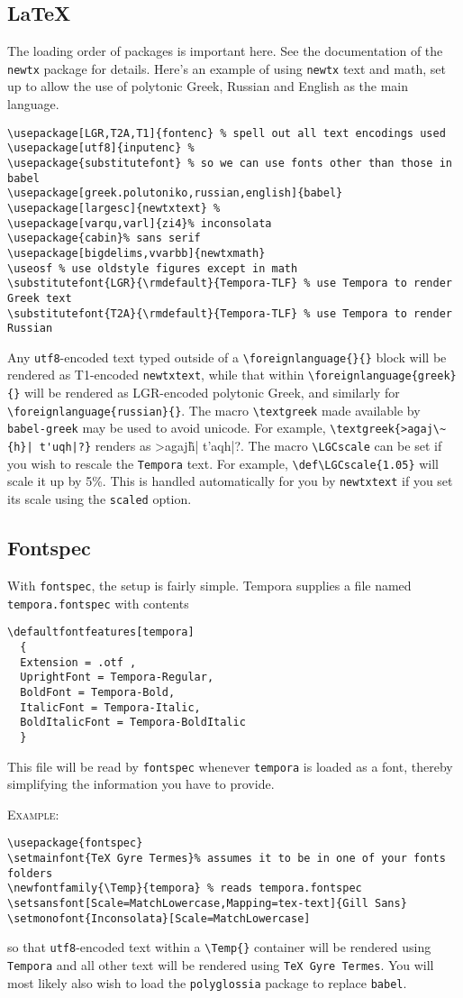 \documentclass[11pt]{article}
\begin{document}
\subsection*{LaTeX} The loading order of packages is important here. See the documentation of the {\tt newtx} package for details. Here's an example of using {\tt newtx} text and math, set up to allow the use of polytonic Greek, Russian and English as the main language.
\begin{verbatim}
\usepackage[LGR,T2A,T1]{fontenc} % spell out all text encodings used
\usepackage[utf8]{inputenc} % 
\usepackage{substitutefont} % so we can use fonts other than those in babel
\usepackage[greek.polutoniko,russian,english]{babel}
\usepackage[largesc]{newtxtext} % 
\usepackage[varqu,varl]{zi4}% inconsolata
\usepackage{cabin}% sans serif
\usepackage[bigdelims,vvarbb]{newtxmath}
\useosf % use oldstyle figures except in math
\substitutefont{LGR}{\rmdefault}{Tempora-TLF} % use Tempora to render Greek text
\substitutefont{T2A}{\rmdefault}{Tempora-TLF} % use Tempora to render Russian 
\end{verbatim}
Any {\tt utf8}-encoded text typed outside of a \verb|\foreignlanguage{}{}| block will be rendered as T1-encoded {\tt newtxtext}, while that within \verb|\foreignlanguage{greek}{}| will be rendered as LGR-encoded polytonic Greek, and similarly for \verb|\foreignlanguage{russian}{}|. The macro \verb|\textgreek| made available by {\tt babel-greek} may be used to avoid unicode. For example, \verb+\textgreek{>agaj\~{h}| t'uqh|?}+ renders as \textgreek{>agaj\~{h}| t'aqh|?}. The macro \verb|\LGCscale| can be set if you wish to rescale the {\tt Tempora} text. For example, \verb|\def\LGCscale{1.05}| will scale it up by 5\%. This is handled automatically for you by {\tt newtxtext} if you set its scale using the {\tt scaled} option.

\subsection*{Fontspec} With {\tt fontspec}, the setup is fairly simple. Tempora supplies a file named {\tt tempora.fontspec} with contents
\begin{verbatim}
\defaultfontfeatures[tempora]
  {
  Extension = .otf ,
  UprightFont = Tempora-Regular,
  BoldFont = Tempora-Bold,
  ItalicFont = Tempora-Italic,
  BoldItalicFont = Tempora-BoldItalic
  }
\end{verbatim}
This file will be read by {\tt fontspec} whenever {\tt tempora} is loaded as a font, thereby simplifying the information you have to provide. 

\textsc{Example:}
\begin{verbatim}
\usepackage{fontspec}
\setmainfont{TeX Gyre Termes}% assumes it to be in one of your fonts folders
\newfontfamily{\Temp}{tempora} % reads tempora.fontspec
\setsansfont[Scale=MatchLowercase,Mapping=tex-text]{Gill Sans}
\setmonofont{Inconsolata}[Scale=MatchLowercase]
\end{verbatim}
so that {\tt utf8}-encoded text within a \verb|\Temp{}| container will be rendered using {\tt Tempora} and all other text will be rendered using {\tt TeX Gyre Termes}. You will most likely also wish to load the {\tt polyglossia} package to replace {\tt babel}.
\end{document}
